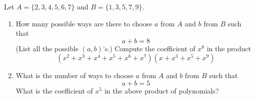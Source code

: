   Let $A = \{2, 3, 4, 5, 6, 7 \}$ and $B = \{ 1, 3, 5, 7, 9\}$.
  \begin{enumerate}[nosep,label=(\alph*)]
  \item
    How many possible ways are there to choose $a$ from $A$ and $b$ from $B$
    such that
    \[
    a + b = 8
    \]
    (List all the possible $(a,b)$'s.)
    Compute the coefficient of $x^8$ in the product
    \[
    (x^2+x^3+x^4+x^5+x^6+x^7)(x+x^3+x^5+x^9)
    \]
  \item
    What is the number of ways to choose $a$ from $A$ and $b$ from $B$
    such that 
    \[
    a + b = 5
    \]
    What is the coefficient of $x^5$ in the above product of polynomials?
  \end{enumerate}
